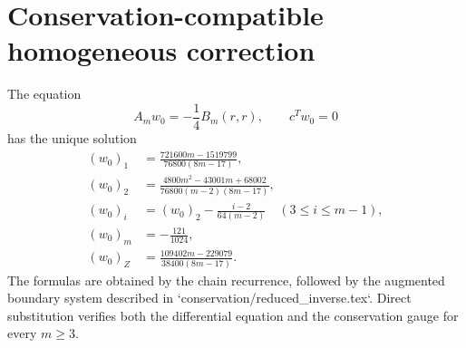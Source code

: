 \section*{Conservation-compatible homogeneous correction}
The equation
\[
A_mw_0=-\frac14B_m(r,r),
\qquad c^Tw_0=0
\]
has the unique solution
\begin{align*}
(w_0)_1&=\frac{721600m-1519799}{76800(8m-17)},\\
(w_0)_2&=\frac{4800m^2-43001m+68002}
 {76800(m-2)(8m-17)},\\
(w_0)_i&=(w_0)_2-\frac{i-2}{64(m-2)}
 \quad(3\le i\le m-1),\\
(w_0)_m&=-\frac{121}{1024},\\
(w_0)_Z&=\frac{109402m-229079}{38400(8m-17)}.
\end{align*}
The formulas are obtained by the chain recurrence, followed by the augmented
boundary system described in `conservation/reduced_inverse.tex`.  Direct
substitution verifies both the differential equation and the conservation
gauge for every $m\ge3$.
